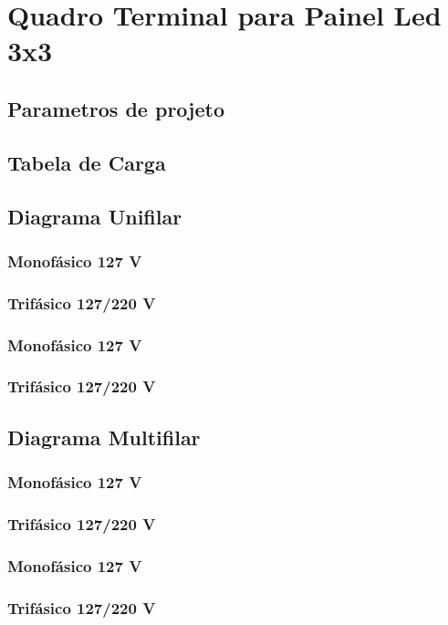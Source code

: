 \section{Quadro Terminal para Painel Led 3x3}
\subsection{Parametros de projeto}
\subsection{Tabela de Carga}
\subsection{Diagrama Unifilar}
\subsubsection{Monofásico 127 V}
\subsubsection{Trifásico 127/220 V}
\subsubsection{Monofásico 127 V}
\subsubsection{Trifásico 127/220 V}

\subsection{Diagrama Multifilar}
\subsubsection{Monofásico 127 V}
\subsubsection{Trifásico 127/220 V}
\subsubsection{Monofásico 127 V}
\subsubsection{Trifásico 127/220 V}

